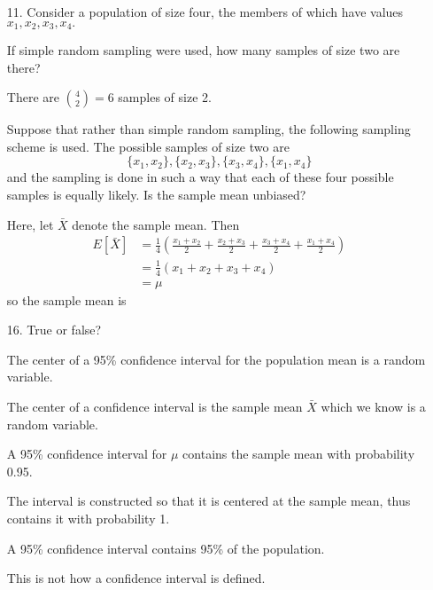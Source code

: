 \documentclass{article}
\begin{document}
\begin{itemize}
\begin{soln}
		\end{soln}

	\item[11.] Consider a population of size four, the members of which have values $x_1, x_2, x_3, x_4.$
		\begin{enumerate}[a.]
			\ii If simple random sampling were used, how many samples of size two are there?
			\begin{soln}
				There are $\binom{4}{2}=\boxed{6}$ samples of size 2.
				
			\end{soln}

			\ii Suppose that rather than simple random sampling, the following sampling scheme is used. The possible samples of size two are \[ \{x_1, x_2\}, \{x_2, x_3\}, \{x_3, x_4\}, \{x_1, x_4\}\] and the sampling is done in such a way that each of these four possible samples is equally likely. Is the sample mean unbiased?
			\begin{soln}
				Here, let $\bar{X}$ denote the sample mean. Then 
				\begin{align*}
					E[\bar{X}] &= \frac{1}{4}\left( \frac{x_1+x_2}{2}+\frac{x_2+x_3}{2}+\frac{x_3+x_4}{2}+\frac{x_1+x_4}{2} \right) \\
					&= \frac{1}{4} (x_1+x_2+x_3+x_4) \\
					&= \mu
				\end{align*} so the sample mean is  

			\end{soln}
		\end{enumerate}

	\item[16.] True or false?
		\begin{enumerate}[a.]
			\ii The center of a 95\% confidence interval for the population mean is a random variable.
			\begin{answer*}
				 The center of a confidence interval is the sample mean $\bar{X}$ which we know is a random variable.
			\end{answer*}
			
			\ii A 95\% confidence interval for $\mu$ contains the sample mean with probability 0.95.
			\begin{answer*}
				 The interval is constructed so that it is centered at the sample mean, thus contains it with probability 1.
			\end{answer*}

			\ii A 95\% confidence interval contains 95\% of the population.
			\begin{answer*}
				 This is not how a confidence interval is defined.
			\end{answer*}


\end{enumerate}
\end{itemize}
\end{document}
